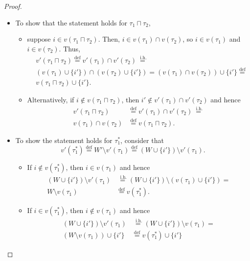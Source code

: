 \documentclass{article}
\newcommand{\lcap}{\sqcap}
\newcommand{\lstar}{^*}
\newcommand{\eqdef}{\stackrel{\text{def}}{=}}
\newcommand{\eqih}{\stackrel{\text{ i.h.}}{=}}
\begin{document}
\begin{proof}
\begin{itemize}
\begin{itemize}
    \item To show that the statement holds for $\tau_1 \lcap \tau_2$,
      \begin{itemize}
      \item suppose $i \in v(\tau_1 \lcap \tau_2)$. Then, $i \in v(\tau_1) \cap v(\tau_2)$, so $i \in v(\tau_1)$ and $i \in v(\tau_2)$. Thus,
        \begin{align*}
          &v'(\tau_1 \lcap \tau_2) \eqdef v'(\tau_1) \cap v'(\tau_2) \eqih \\
          &(v(\tau_1) \cup \{i'\}) \cap (v(\tau_2) \cup \{i'\}) = (v(\tau_1) \cap v(\tau_2)) \cup \{i'\} \eqdef \\
          &v(\tau_1 \lcap \tau_2) \cup \{i'\}.
        \end{align*}

      \item Alternatively, if $i \not \in v(\tau_1 \lcap \tau_2)$, then $i' \not \in v'(\tau_1) \cap v'(\tau_2)$ and hence
        \begin{align*}
          v'(\tau_1 \lcap \tau_2) &\eqdef v'(\tau_1) \cap v'(\tau_2) \eqih \\
          v(\tau_1) \cap v(\tau_2) &\eqdef v(\tau_1 \lcap \tau_2).
        \end{align*}
      \end{itemize}


    \item To show the statement holds for $\tau_1\lstar$, consider that
      \begin{equation*}
        v'(\tau_1\lstar) \eqdef W' \setminus v'(\tau_1) \eqdef (W \cup \{i'\}) \setminus v'(\tau_1).
      \end{equation*}
      \begin{itemize}
      \item If $i \not \in v(\tau_1\lstar)$, then $i \in v(\tau_1)$ and hence
        \begin{align*}
          (W \cup \{i'\}) \setminus v'(\tau_1) &\eqih (W \cup \{i'\}) \setminus (v(\tau_1) \cup \{i'\}) = \\
          W \setminus v(\tau_1) &\eqdef v(\tau_1\lstar).
        \end{align*}

      \item If $i \in v(\tau_1\lstar)$, then $i \not \in v(\tau_1)$ and hence
        \begin{align*}
          (W \cup \{i'\}) \setminus v'(\tau_1) &\eqih (W \cup \{i'\}) \setminus v(\tau_1) = \\
          (W \setminus v(\tau_1)) \cup \{i'\} &\eqdef v(\tau_1\lstar) \cup \{i'\}
        \end{align*}
      \end{itemize}


\end{itemize}
\end{itemize}
\end{proof}
\end{document}
